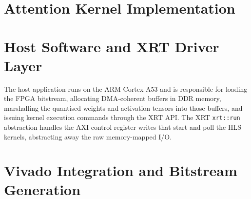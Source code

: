 \lipsum[4] %

\section{Attention Kernel Implementation}
\label{sec:attention_impl}

\lipsum[5] %

\section{Host Software and XRT Driver Layer}
\label{sec:host_software}

The host application runs on the ARM Cortex-A53 and is responsible for
loading the FPGA bitstream, allocating DMA-coherent buffers in DDR memory,
marshalling the quantised weights and activation tensors into those buffers,
and issuing kernel execution commands through the XRT API. The XRT
\texttt{xrt::run} abstraction handles the AXI control register writes that
start and poll the HLS kernels, abstracting away the raw memory-mapped I/O.

\lipsum[6] %

\section{Vivado Integration and Bitstream Generation}
\label{sec:vivado}

\lipsum[7] %
